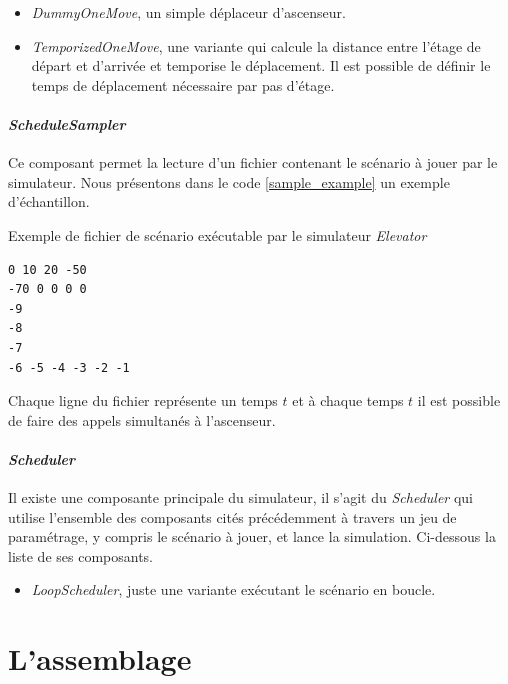 \documentclass[twocolumn,oneside,10pt]{article}
\newcommand {\elevator}   {{\em Elevator}}
\begin{document}
\begin{itemize}
\item {\em DummyOneMove}, un simple déplaceur d'ascenseur.\\
\item {\em TemporizedOneMove}, une variante qui calcule la distance entre l'étage de départ et d'arrivée et temporise le déplacement. Il est possible de définir le temps de déplacement nécessaire par pas d'étage.
\end{itemize}

\paragraph{\em ScheduleSampler}

Ce composant permet la lecture d'un fichier contenant le scénario à jouer par le simulateur. Nous présentons dans le code \ref{sample_example} un exemple d'échantillon.

\begin{algorithm}[h]
  \caption{Exemple de fichier de scénario exécutable par le simulateur \elevator}
  \label{sample_example}
\begin{verbatim}
0 10 20 -50
-70 0 0 0 0
-9
-8
-7
-6 -5 -4 -3 -2 -1
\end{verbatim}
\end{algorithm}

Chaque ligne du fichier représente un temps $t$ et à chaque temps $t$ il est possible de faire des appels simultanés à l'ascenseur.

\paragraph{\em Scheduler}

Il existe une composante principale du simulateur, il s'agit du {\em Scheduler} qui utilise l'ensemble des composants cités précédemment à travers un jeu de paramétrage, y compris le scénario à jouer, et lance la simulation. Ci-dessous la liste de ses composants.\\

\begin{itemize}
\item {\em LoopScheduler}, juste une variante exécutant le scénario en boucle.
\end{itemize}

\section{L'assemblage}
\end{document}
